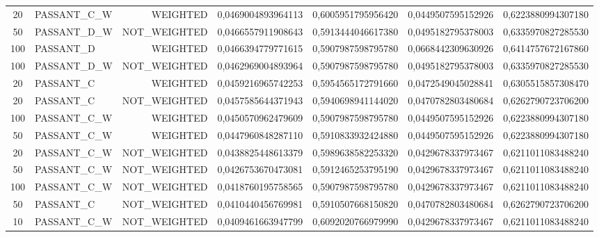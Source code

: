 \begin{table}[H]
{\begin{tabular}{ c l r c c c c }
				20 & PASSANT\_C\_W &   WEIGHTED & 0,0469004893964113 & 0,6005951795956420 & 0,0449507595152926 & 0,6223880994307180 \\
				
				50 & PASSANT\_D\_W & NOT\_WEIGHTED & 0,0466557911908643 & 0,5913444046617380 & 0,0495182795378003 & 0,6335970827285530 \\
				
				100 &  PASSANT\_D &   WEIGHTED & 0,0466394779771615 & 0,5907987598795780 & 0,0668442309630926 & 0,6414757672167860 \\
				
				100 & PASSANT\_D\_W & NOT\_WEIGHTED & 0,0462969004893964 & 0,5907987598795780 & 0,0495182795378003 & 0,6335970827285530 \\
				
				20 &  PASSANT\_C &   WEIGHTED & 0,0459216965742253 & 0,5954565172791660 & 0,0472549045028841 & 0,6305515857308470 \\
				
				20 &  PASSANT\_C & NOT\_WEIGHTED & 0,0457585644371943 & 0,5940698941144020 & 0,0470782803480684 & 0,6262790723706200 \\
				
				100 & PASSANT\_C\_W &   WEIGHTED & 0,0450570962479609 & 0,5907987598795780 & 0,0449507595152926 & 0,6223880994307180 \\
				
				50 & PASSANT\_C\_W &   WEIGHTED & 0,0447960848287110 & 0,5910833932424880 & 0,0449507595152926 & 0,6223880994307180 \\
				
				20 & PASSANT\_C\_W & NOT\_WEIGHTED & 0,0438825448613379 & 0,5989638582253320 & 0,0429678337973467 & 0,6211011083488240 \\
				
				50 & PASSANT\_C\_W & NOT\_WEIGHTED & 0,0426753670473081 & 0,5912465253795190 & 0,0429678337973467 & 0,6211011083488240 \\
				
				100 & PASSANT\_C\_W & NOT\_WEIGHTED & 0,0418760195758565 & 0,5907987598795780 & 0,0429678337973467 & 0,6211011083488240 \\
				
				50 &  PASSANT\_C & NOT\_WEIGHTED & 0,0410440456769981 & 0,5910507668150820 & 0,0470782803480684 & 0,6262790723706200 \\
				
				10 & PASSANT\_C\_W & NOT\_WEIGHTED & 0,0409461663947799 & 0,6092020766979990 & 0,0429678337973467 & 0,6211011083488240 \\
				

\end{tabular}}
\end{table}
